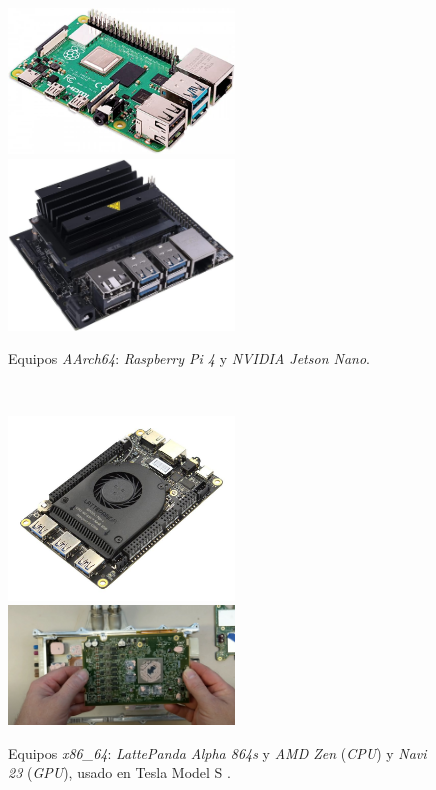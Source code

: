 \begin{figure} [h!]
	\begin{center}
		\includegraphics[width=6cm]{figs/raspberrypi}\hspace{0.5cm}\includegraphics[width=6cm]{figs/jetsonnano}
	\end{center}
	\caption{Equipos \textit{AArch64}: \textit{Raspberry Pi 4} y \textit{NVIDIA Jetson Nano}.}
	\label{fig:aarch64}
\end{figure}\

\begin{figure} [h!]
	\begin{center}
		\includegraphics[width=6cm]{figs/lattepanda}\hspace{0.5cm}\includegraphics[width=6cm]{figs/teslazenrdna2}
	\end{center}
	\caption{Equipos \textit{x86\_64}: \textit{LattePanda Alpha 864s} y \textit{AMD Zen} (\textit{CPU}) y \textit{Navi 23} (\textit{GPU}), usado en Tesla Model S \cite{teslazenrdna2}.}
	\label{fig:x86}
\end{figure}\

